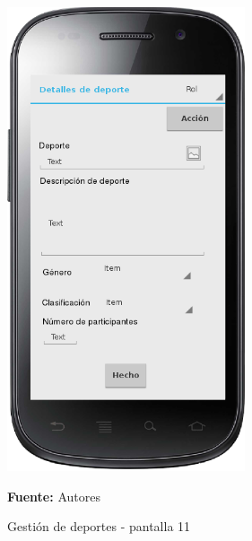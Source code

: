 \begin{figure}[!htb]
  \begin{center}
    \includegraphics[width=7cm]{./imagenes/UI/Deportes/gestion_deportes_11.png}
    \caption{Gestión de deportes - pantalla 11}
    \label{fig:gestion_deportes_11}
    \textbf{Fuente:}  Autores
  \end{center}
\end{figure}

